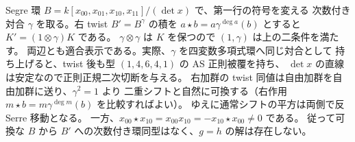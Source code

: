 \begin{example}[二行列を一行列に制限できない例]\label{ex:two-matrix-segre}
Segre 環 $B=k[x_{00},x_{01},x_{10},x_{11}]/(\det x)$ で、第一行の符号を変える
次数付き対合 $\gamma$ を取る。右 twist $B'=B^\gamma$ の積を
$a\star b=a\gamma^{\deg a}(b)$ とすると $K'=(1\otimes\gamma)K$ である。
$\gamma\otimes\gamma$ は $K$ を保つので $(1,\gamma)$ は上の二条件を満たす。
両辺とも適合表示である。実際、$\gamma$ を四変数多項式環へ同じ対合として
持ち上げると、twist 後も型 $(1,4,6,4,1)$ の AS 正則被覆を持ち、
$\det x$ の直線は安定なので正則正規二次切断を与える。
右加群の twist 同値は自由加群を自由加群に送り、$\gamma^2=1$ より
二重シフトと自然に可換する（右作用 $m\star b=m\gamma^{\deg m}(b)$ を比較すればよい）。
ゆえに通常シフトの平方は両側で反 Serre 移動となる。
一方、$x_{00}\star x_{10}=x_{00}x_{10}=-x_{10}\star x_{00}\ne0$ である。
従って可換な $B$ から $B'$ への次数付き環同型はなく、$g=h$ の解は存在しない。
\end{example}
